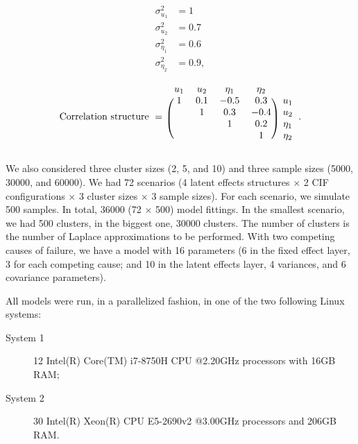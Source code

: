 \documentclass[a4paper,12pt]{article}
\begin{document}
\begin{minipage}{0.15\textwidth}
 \begin{align*}
  \sigma_{u_{1}}^{2}   &= 1\\
  \sigma_{u_{2}}^{2}   &= 0.7\\
  \sigma_{\eta_{1}}^{2} &= 0.6\\
  \sigma_{\eta_{2}}^{2} &= 0.9,
 \end{align*}
\end{minipage}%
\begin{minipage}{0.85\textwidth}
 \[
  \text{Correlation structure}~=~\begin{blockarray}{ccccc}
                                  u_{1} & u_{2} & \eta_{1} & \eta_{2}\\
                                  \begin{block}{(cccc)c}
                                   1 & 0.1 & -0.5 &  0.3 & u_{1}\\
                                     &   1 &  0.3 & -0.4 & u_{2}\\
                                     &     &    1 &  0.2 & \eta_{1}\\
                                     &     &      &    1 & \eta_{2}\\
                                  \end{block}
                                 \end{blockarray}.
 \]
\end{minipage}

\vspace{0.3cm}
\noindent
We also considered three cluster sizes (2, 5, and 10) and three sample
sizes (5000, 30000, and 60000). We had 72 scenarios (4 latent effects
structures \(\times\) 2 CIF configurations \(\times\) 3 cluster sizes
\(\times\) 3 sample sizes). For each scenario, we simulate 500
samples. In total, 36000 (72 \(\times\) 500) model fittings. In the
smallest scenario, we had 500 clusters, in the biggest one, 30000
clusters. The number of clusters is the number of Laplace approximations
to be performed. With two competing causes of failure, we have a model
with 16 parameters (6 in the fixed effect layer, 3 for each competing
cause; and 10 in the latent effects layer, 4 variances, and 6 covariance
parameters).

All models were run, in a parallelized fashion, in one of the two
following Linux systems:
\begin{description}
 \item[System 1] 12 Intel(R) Core(TM) i7-8750H CPU @2.20GHz processors
   with 16GB RAM;
 \item[System 2] 30 Intel(R) Xeon(R) CPU E5-2690v2 @3.00GHz processors
   and 206GB RAM.
\end{description}
\end{document}
